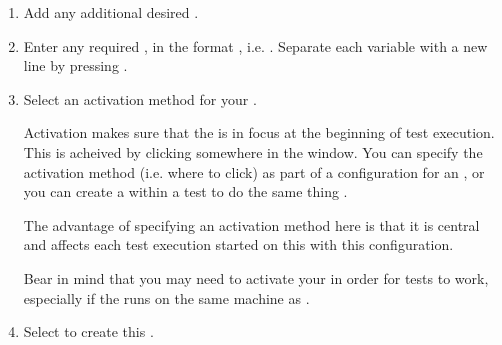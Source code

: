 \begin{enumerate}
\item Add any additional desired . 
\item Enter any required , in the
format , i.e. . 
Separate each variable with a new line by pressing .



\item Select an activation method for your \gdaut{}. 

Activation makes sure that the  \gdaut{} is in focus at the beginning of test execution. This is acheived by clicking somewhere in the \gdaut{} window. You can specify the activation method (i.e. where to click) as part of a configuration for an \gdaut{}, or you can create a \gdstep{} within a test to do the same thing . 

The advantage of specifying an activation method here is that it is central and affects each test execution started on this \gdaut{} with this configuration. 

Bear in mind that you may need to activate your \gdaut{} in order for tests to work, especially if the \gdaut{} runs on the same machine as \jb{}. 


\item Select  to create this \gdproject{}. 

\end{enumerate}


\clearpage
